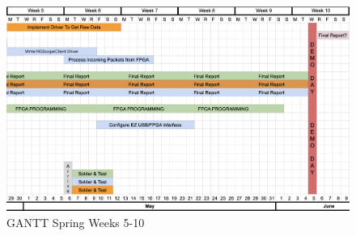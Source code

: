 			\begin{figure}[H]
				\centering
				\includegraphics[width=0.8\linewidth]{images/GANTT4.png}
				\caption{GANTT Spring Weeks 5-10}
				\label{fig:gantt4}
				\vspace{15px}
			\end{figure}
			